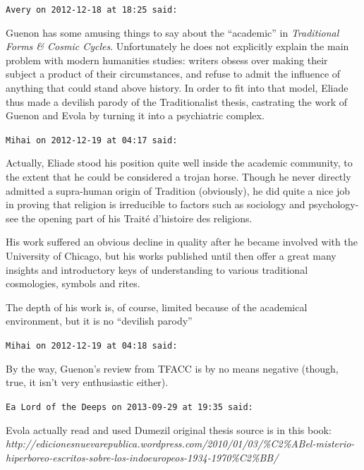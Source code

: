 \begin{footnotesize}
\begin{sffamily}
\texttt{Avery on 2012-12-18 at 18:25 said:}

Guenon has some amusing things to say about the ``academic'' in \emph{Traditional Forms \& Cosmic Cycles}. Unfortunately he does not explicitly explain the main problem with modern humanities studies: writers obsess over making their subject a product of their circumstances, and refuse to admit the influence of anything that could stand above history. In order to fit into that model, Eliade thus made a devilish parody of the Traditionalist thesis, castrating the work of Guenon and Evola by turning it into a psychiatric complex.

\hfill

\texttt{Mihai on 2012-12-19 at 04:17 said:}

Actually, Eliade stood his position quite well inside the academic community, to the extent that he could be considered a trojan horse. Though he never directly admitted a supra-human origin of Tradition (obviously), he did quite a nice job in proving that religion is irreducible to factors such as sociology and psychology- see the opening part of his Traité d'histoire des religions.

His work suffered an obvious decline in quality after he became involved with the University of Chicago, but his works published until then offer a great many insights and introductory keys of understanding to various traditional cosmologies, symbols and rites.

The depth of his work is, of course, limited because of the academical environment, but it is no ``devilish parody''

\hfill

\texttt{Mihai on 2012-12-19 at 04:18 said:}

By the way, Guenon's review from TFACC is by no means negative (though, true, it isn't very enthusiastic either).

\hfill

\texttt{Ea Lord of the Deeps on 2013-09-29 at 19:35 said:}

Evola actually read and used Dumezil original thesis source is in this book:
\textit{http://edicionesnuevarepublica.wordpress.com/2010/01/03/\%C2\%ABel-misterio-hiperboreo-escritos-sobre-los-indoeuropeos-1934-1970\%C2\%BB/}

\hfill

\end{sffamily}
\end{footnotesize}

